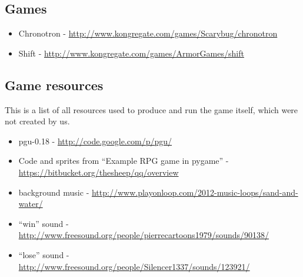 \subsection{Games}

\begin{itemize}
\item Chronotron - \url{http://www.kongregate.com/games/Scarybug/chronotron}
\item Shift - \url{http://www.kongregate.com/games/ArmorGames/shift}
\end{itemize}

\subsection{Game resources}
This is a list of all resources used to produce and run the game
itself, which were not created by us.

\begin{itemize}
\item pgu-0.18 - \url{http://code.google.com/p/pgu/}
\item Code and sprites from ``Example RPG game in pygame'' - \url{https://bitbucket.org/thesheep/qq/overview}
\item background music - \url{http://www.playonloop.com/2012-music-loops/sand-and-water/}
\item ``win'' sound - \url{http://www.freesound.org/people/pierrecartoons1979/sounds/90138/}
\item ``lose'' sound - \url{http://www.freesound.org/people/Silencer1337/sounds/123921/}
\end{itemize}



